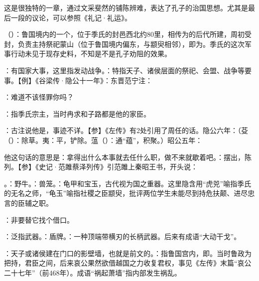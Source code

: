 {
这是很独特的一章，通过文采斐然的铺陈辨难，表达了孔子的治国思想。尤其是最后一段的议论，可以参照《礼记·礼运》。
\begin{lyitemize}
\item {}（）：鲁国境内的一个，位于季氏的封邑西北约80里，相传为的后代所建，周初受封，负责主持祭祀蒙山（位于鲁国境内偏东，与颛臾相邻），即为。季氏的这次军事行动未见于现存史料，不知是不是孔子劝阻的效果。
\item {}：有国家大事，这里指发动战争。：特指天子、诸侯层面的祭祀、会盟、战争等要事。【例】《谷梁传·隐公十一年》：东晋范宁注：
\item {}：难道不该怪罪你吗？
\item {}：指季氏宗主，当时冉求和子路都是他的家臣。
\item {}：古注说他是，事迹不详。【参】《左传》有2处引用了周任的话。隐公六年：（芟（）：除草。夷：平，铲除。蕰（）：通“蕴”，积聚。）昭公五年：

他这句话的意思是：拿得出什么本事就去任什么职，做不来就歇着吧。：摆出，陈列。【参】《史记·范雎蔡泽列传》引范雎上秦昭王书，开头说：

\item {}。：野牛。：兽笼。：龟甲和宝玉，古代视为国之重器。这里隐含用“虎兕”喻指季氏的无名之师，“龟玉”喻指社稷之臣颛臾，批评两位学生未能尽到持危扶颠、进尽忠言的臣辅之职。
\item {}：非要替它找个借口。
\item {}：泛指武器。：盾牌。：一种顶端带横刃的长柄武器。后来有成语“大动干戈”。

\item {}：天子或诸侯建在门口的影壁墙，也就是前文的。：指鲁国宫内，即。当时鲁政为把持，君臣之间，后来哀公果然欲借越国之力收复君权，事见《左传》末篇“哀公二十七年”（前468年）。成语“祸起萧墙”指内部发生祸乱。
\end{lyitemize}
}
{}


